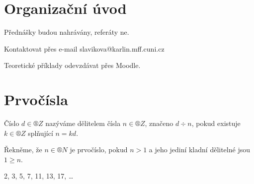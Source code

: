 \documentclass[12pt]{article}					%
\begin{document}
\section*{Organizační úvod}
   Přednášky budou nahrávány, referáty ne.

   Kontaktovat přes e-mail slavikova@karlin.mff.cuni.cz

   Teoretické příklady odevzdávat přes Moodle.

\section{Prvočísla}
    \begin{definice}[Dělitel]
        Číslo $d \in ®Z$ nazýváme dělitelem čísla $n \in ®Z$, značeno $d\div n$, pokud existuje $k \in ®Z$ splňující $n = kd$.
    \end{definice}
    
    \begin{definice}[Prvočíslo]
        Řekněme, že $n \in ®N$ je prvočíslo, pokud $n>1$ a jeho jediní kladní dělitelné jsou $1≥n$.
        \begin{prikladyin}
            2, 3, 5, 7, 11, 13, 17, …
        \end{prikladyin}
    \end{definice}
\end{document}
